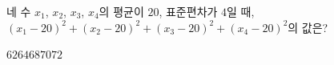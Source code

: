 네 수 $x_1$, $x_2$, $x_3$, $x_4$의 평균이 $20$, 표준편차가 $4$일 때, $(x_1-20)^2+(x_2-20)^2+(x_3-20)^2+(x_4-20)^2$의 값은?
\begin{choices32}{$62$}{$64$}{$68$}{$70$}{$72$}\end{choices32}

